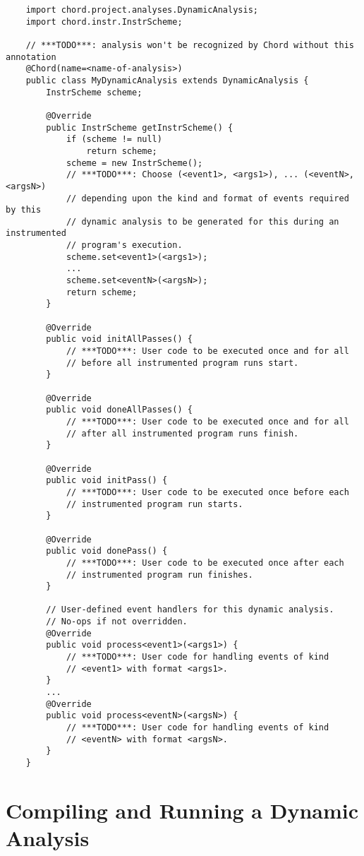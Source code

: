\begin{verbatim}
    import chord.project.analyses.DynamicAnalysis;
    import chord.instr.InstrScheme;

    // ***TODO***: analysis won't be recognized by Chord without this annotation
    @Chord(name=<name-of-analysis>)    
    public class MyDynamicAnalysis extends DynamicAnalysis {
        InstrScheme scheme;

        @Override
        public InstrScheme getInstrScheme() {
            if (scheme != null)
                return scheme;
            scheme = new InstrScheme();
            // ***TODO***: Choose (<event1>, <args1>), ... (<eventN>, <argsN>)
            // depending upon the kind and format of events required by this
            // dynamic analysis to be generated for this during an instrumented
            // program's execution.
            scheme.set<event1>(<args1>);
            ...
            scheme.set<eventN>(<argsN>);
            return scheme;
        }

        @Override
        public void initAllPasses() {
            // ***TODO***: User code to be executed once and for all
            // before all instrumented program runs start.
        }

        @Override
        public void doneAllPasses() {
            // ***TODO***: User code to be executed once and for all
            // after all instrumented program runs finish.
        }

        @Override
        public void initPass() {
            // ***TODO***: User code to be executed once before each
            // instrumented program run starts.
        }

        @Override
        public void donePass() {
            // ***TODO***: User code to be executed once after each
            // instrumented program run finishes.
        }

        // User-defined event handlers for this dynamic analysis.
        // No-ops if not overridden.
        @Override
        public void process<event1>(<args1>) {
            // ***TODO***: User code for handling events of kind
            // <event1> with format <args1>.
        }
        ...
        @Override
        public void process<eventN>(<argsN>) {
            // ***TODO***: User code for handling events of kind
            // <eventN> with format <argsN>.
        }
    }
\end{verbatim}

\section{Compiling and Running a Dynamic Analysis}
\label{sec:running-dynamic-analysis}

